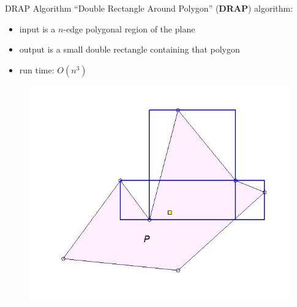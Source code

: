 \documentclass[10pt]{beamer}
\begin{document}
\begin{frame}{DRAP Algorithm}
  ``Double Rectangle Around Polygon'' (\textbf{DRAP}) algorithm:\\
  \begin{itemize}
  \item input is a $n$-edge polygonal region of the plane
  \item output is a small double rectangle containing that polygon
  \item run time: $O(n^3)$
  \end{itemize}
  \begin{figure}
    \includegraphics[scale=0.3]{figs/drap4.jpg}
  \end{figure}
\end{frame}
\end{document}

